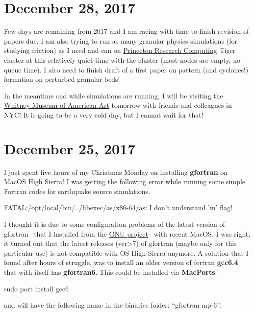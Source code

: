 \documentclass[12pt]{article}
\newenvironment{ppl}{\ttfamily}{\par}
\begin{document}



\section*{\large December 28, 2017}

Few days are remaining from 2017 and I am racing with time to finish revision of papers due. I am also trying to run as many granular physics simulations (for studying friction) as I need and can on \href{https://www.princeton.edu/researchcomputing/index.xml}{Princeton Research Computing} Tiger cluster at this relatively quiet time with the cluster (most nodes are empty, no queue time). I also need to finish draft of a first paper on pattern (and cyclones!) formation on perturbed granular beds!

In the meantime and while simulations are running, I will be visiting the \href{http://whitney.org}{Whitney Museum of American Art} tomorrow with friends and colleagues in NYC! It is going to be a very cold day, but I cannot wait for that!
  


\section*{\large December 25, 2017}
\vspace{-0.1 in}

I just spent five hours of my Christmas Monday on installing {\bf gfortran} on MacOS High Sierra! I was getting the following error while running some simple Fortran codes for earthquake source simulations. 

\begin{ppl}
FATAL:/opt/local/bin/../libexec/as/x86-64/as: I don't understand 'm' flag! 
\end{ppl}

I thought it is due to some configuration problems of the latest version of gfortran --that I installed from the \href{https://gcc.gnu.org/wiki/GFortranBinariesMacOS}{GNU project}-- with recent MacOS. I was right, it turned out that the latest releases (ver>7) of gfortran (maybe only for this particular use) is not compatible with OS High Sierra anymore. A solution that I found after hours of struggle, was to install an older version of fortran {\bf gcc6.4} that with itself has {\bf gfortran6}. This could be installed via {\bf MacPorts}:

\begin{ppl}
sudo port install gcc6
\end{ppl}

and will have the following name in the binaries folder: ``gfortran-mp-6''.


%




%
%
\end{document}
